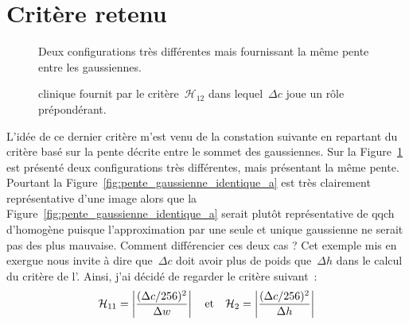 \documentclass[main.tex]{subfiles}
\begin{document}
\section{Critère retenu}
\begin{figure}
\centering
{}
\caption{\label{fig:pente_gaussienne_identique}Deux configurations très différentes mais fournissant la même pente entre les gaussiennes.}
\end{figure}
%

\begin{figure}
\centering
{}
\caption{\label{fig:critere_dc2_sur_dh}\Hetero clinique fournit par le critère~$\mathcal{H}_{12}$ dans lequel~$\Delta c$ joue un rôle prépondérant.}
\end{figure}
L'idée de ce dernier critère m'est venu de la constation suivante en repartant du critère basé sur la pente décrite entre le sommet des gaussiennes. Sur la Figure~\ref{fig:pente_gaussienne_identique} est présenté deux configurations très différentes, mais présentant la même pente. Pourtant la Figure~\ref{fig:pente_gaussienne_identique_a} est très clairement représentative d'une image \heterogene alors que la Figure~\ref{fig:pente_gaussienne_identique_a} serait plutôt représentative de qqch d'homogène puisque l'approximation par une seule et unique gaussienne ne serait pas des plus mauvaise. 
Comment différencier ces deux cas ? Cet exemple mis en exergue nous invite à dire que~$\Delta c$ doit avoir plus de poids que~$\Delta h$ dans le calcul du critère de l'\hetero. Ainsi, j'ai décidé de regarder le critère suivant~:
\begin{equation}
\label{eq:criteres_finaux}
\mathcal{H}_{11} =  \left| \dfrac{(\Delta c /256)^2}{\Delta w} \right| 
\quad {\rm et } \quad
\mathcal{H}_{2} =  \left| \dfrac{(\Delta c /256)^2}{\Delta h} \right|
\end{equation}
\end{document}
